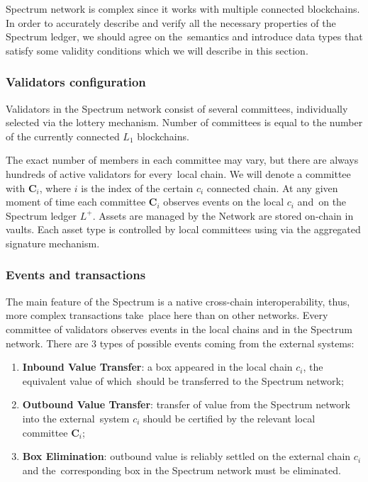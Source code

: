 Spectrum network is complex since it works with multiple connected blockchains.
In order to accurately describe and verify all the necessary properties of the Spectrum ledger, we should agree on the\
semantics and introduce data types that satisfy some validity conditions which we will describe in this section.

\subsubsection{Validators configuration}

Validators in the Spectrum network consist of several committees, individually selected via the lottery mechanism.
Number of committees is equal to the number of the currently connected $L_1$ blockchains.

The exact number of members in each committee may vary, but there are always hundreds of active validators for every\
local chain.
We will denote a committee with $\mathbf{C}_i$, where $i$ is the index of the certain $c_i$ connected chain.
At any given moment of time each committee $\mathbf{C}_i$ observes events on the local $c_i$ and\
on the Spectrum ledger $L^+$.
Assets are managed by the Network are stored on-chain in vaults.
Each asset type is controlled by local committees using via the aggregated signature mechanism.

\subsubsection{Events and transactions}

The main feature of the Spectrum is a native cross-chain interoperability, thus, more complex transactions take\
place here than on other networks.
Every committee of validators observes events in the local chains and in the Spectrum network.
There are 3 types of possible events coming from the external systems:
\begin{enumerate}
    \item \textbf{Inbound Value Transfer}: a box appeared in the local chain $c_i$, the equivalent value of which\
    should be transferred to the Spectrum network;
    \item \textbf{Outbound Value Transfer}: transfer of value from the Spectrum network into the external\
    system $c_i$ should be certified by the relevant local committee $\mathbf{C}_i$;
    \item \textbf{Box Elimination}: outbound value is reliably settled on the external chain $c_i$ and the\
    corresponding box in the Spectrum network must be eliminated.
\end{enumerate}

